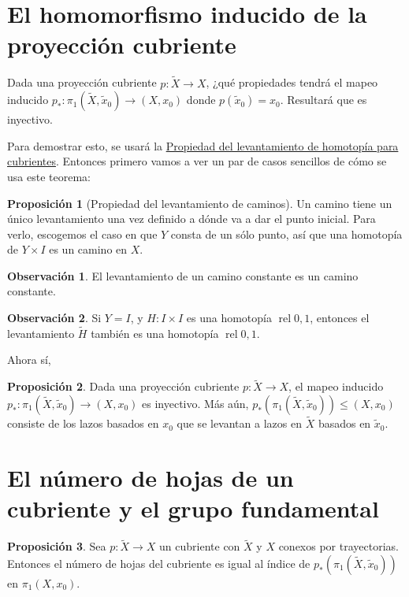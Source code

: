 \documentclass[spanish]{book}
\theoremstyle{definition}
\newtheorem*{obs}{Observación}
\newtheorem*{prop}{Proposición}
\DeclareMathOperator{\rel}{rel}
\begin{document}
\section{El homomorfismo inducido de la proyección cubriente}
Dada una proyección cubriente $p:\tilde{X}\to X$, ¿qué propiedades tendrá el mapeo inducido $p_*:\pi_1(\tilde{X},\tilde{x}_0)\to (X,x_0)$ donde $p(\tilde{x}_0)=x_0$. Resultará que es inyectivo.

Para demostrar esto, se usará la \hyperref[teo-lhc]{Propiedad del levantamiento de homotopía para cubrientes}. Entonces primero vamos a ver un par de casos sencillos de cómo se usa este teorema:
\begin{prop}[Propiedad del levantamiento de caminos]
	Un camino tiene un único levantamiento una vez definido a dónde va a dar el punto inicial. Para verlo, escogemos el caso en que $Y$ consta de un sólo punto, así que una homotopía de $Y\times I$ es un camino en $X$.
\end{prop}
\begin{obs}
	El levantamiento de un camino constante es un camino constante.
\end{obs}
\begin{obs}
	Si $Y=I$, y $H:I\times I$ es una homotopía $\rel 0,1$, entonces el levantamiento $\tilde{H}$ también es una homotopía $\rel 0,1$.
\end{obs}
Ahora sí,
\begin{prop}
	Dada una proyección cubriente $p:\tilde{X}\to X$, el mapeo inducido $p_*:\pi_1(\tilde{X},\tilde{x}_0)\to (X,x_0)$ es inyectivo. Más aún, $p_*\left(\pi_1(\tilde{X},\tilde{x}_0)\right)\leq(X,x_0)$ consiste de los lazos basados en $x_0$ que se levantan a lazos en $\tilde{X}$ basados en $\tilde{x}_0$.
\end{prop}
\section{El número de hojas de un cubriente y el grupo fundamental}
\begin{prop}
	Sea $p:\tilde{X}\to X$ un cubriente con $\tilde{X}$ y $X$ conexos por trayectorias. Entonces el número de hojas del cubriente es igual al índice de $p_*(\pi_1(\tilde{X},\tilde{x}_0))$ en $\pi_1(X,x_0)$.
\end{prop}
\end{document}
